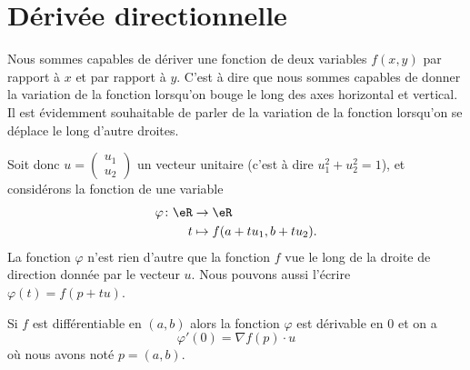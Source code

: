 \section{Dérivée directionnelle}

Nous sommes capables de dériver une fonction de deux variables $f(x,y)$ par rapport à $x$ et par rapport à $y$. C'est à dire que nous sommes capables de donner la variation de la fonction lorsqu'on bouge le long des axes horizontal et vertical. Il est évidemment souhaitable de parler de la variation de la fonction lorsqu'on se déplace le long d'autre droites.

Soit donc $u=\begin{pmatrix}
    u_1    \\ 
    u_2    
\end{pmatrix}$ un vecteur unitaire (c'est à dire $u_1^2+u_2^2=1$), et considérons la fonction de une variable
\begin{equation}
    \begin{aligned}
        \varphi\colon \eR&\to \eR \\
        t&\mapsto f(a+tu_1,b+tu_2). 
    \end{aligned}
\end{equation}
La fonction $\varphi$ n'est rien d'autre que la fonction $f$ vue le long de la droite de direction donnée par le vecteur $u$. Nous pouvons aussi l'écrire $\varphi(t)=f(p+tu)$.

\begin{proposition}
    Si $f$ est différentiable en $(a,b)$ alors la fonction $\varphi$ est dérivable en $0$ et on a
    \begin{equation}
        \varphi'(0)=\nabla f(p)\cdot u
    \end{equation}
    où nous avons noté $p=(a,b)$.
\end{proposition}

